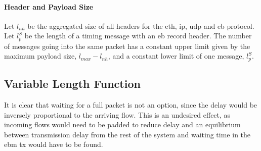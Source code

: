 \paragraph{Header and Payload Size}
Let $l_{nh}$ be the aggregated size of all headers for the \gls{eth}, \gls{ip}, \gls{udp} and \gls{eb} protocol. Let $l^S_p$ be the length of a timing message with an \gls{eb} record header. The number of messages going into the same packet has a constant upper limit given by the maximum payload size, $l_{max} - l_{nh}$, and a constant lower limit of one message, $l^S_p$. 

\subsection{Variable Length Function}

It is clear that waiting for a full packet is not an option, since the delay would be inversely proportional to the arriving flow.
This is an undesired effect, as incoming flows would need to be padded to reduce delay and an equilibrium between transmission delay from the rest of the system
and waiting time in the \gls{ebm} \gls{tx} would have to be found.
